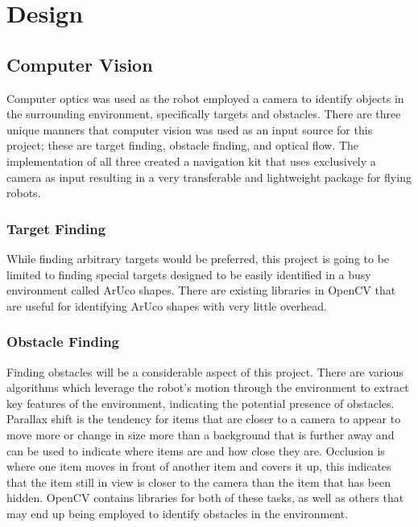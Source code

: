 \documentclass{article}
\begin{document}
		
\section{Design}
	
	\subsection{Computer Vision}
	
	Computer optics was used as the robot employed a camera to identify objects in the surrounding environment, specifically targets and obstacles. There are three unique manners that computer vision was used as an input source for this project; these are target finding, obstacle finding, and optical flow. The implementation of all three created a navigation kit that uses exclusively a camera as input resulting in a very transferable and lightweight package for flying robots.
	
		\subsubsection{Target Finding}
		
		While finding arbitrary targets would be preferred, this project is going to be limited to finding special targets designed to be easily identified in a busy environment called ArUco shapes. There are existing libraries in OpenCV that are useful for identifying ArUco shapes with very little overhead. 
		
		\subsubsection{Obstacle Finding}
		
		Finding obstacles will be a considerable aspect of this project. There are various algorithms which leverage the robot's motion through the environment to extract key features of the environment, indicating the potential presence of obstacles. Parallax shift is the tendency for items that are closer to a camera to appear to move more or change in size more than a background that is further away and can be used to indicate where items are and how close they are. Occlusion is where one item moves in front of another item and covers it up, this indicates that the item still in view is closer to the camera than the item that has been hidden. OpenCV contains libraries for both of these tasks, as well as others that may end up being employed to identify obstacles in the environment.
		
\end{document}
